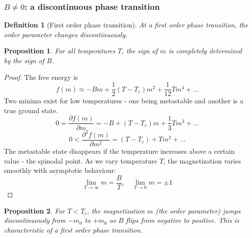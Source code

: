 \documentclass[a4paper]{article}
\theoremstyle{new}
\newtheorem{defi}{Definition}[section]
\newtheorem{prop}{Proposition}[section]
\begin{document}
\subsubsection{$B\neq 0$: a discontinuous phase transition}
\begin{defi}[First order phase transition]
At a first order phase transition, the order parameter changes discontinuously.
\end{defi}
\begin{prop}
For all temperatures $T$, the sign of $m$ is completely determined by the sign of $B$.
\end{prop}
\begin{proof}
The free energy is
$$f(m)\approx-Bm+\frac{1}{2}(T-T_c)m^2+\frac{1}{12}Tm^4+\dots$$
Two minima exist for low temperatures - one being metastable and another is a true ground state. 
$$0=\frac{\partial f(m)}{\partial m}=-B+(T-T_c)m+\frac{1}{3}Tm^3+\dots$$
$$0<\frac{\partial^2f(m)}{\partial m^2}=(T-T_c)+Tm^2+\dots$$
The metastable state disappears if the temperature increases above a certain value - the spinodal point. As we vary temperature $T$, the magnetization varies smoothly with asymptotic behaviour:
$$\lim_{T\rightarrow\infty}m=\frac{B}{T},\quad\lim_{T\rightarrow0}m=\pm1$$
\end{proof}
\begin{center}
\end{center}
\begin{prop}
For $T<T_c$, the magnetization $m$ (the order parameter) jumps discontinuously from $-m_0$ to $+m_0$ as $B$ flips from negative to positive. This is characteristic of a first order phase transition.
\end{prop}
\end{document}
